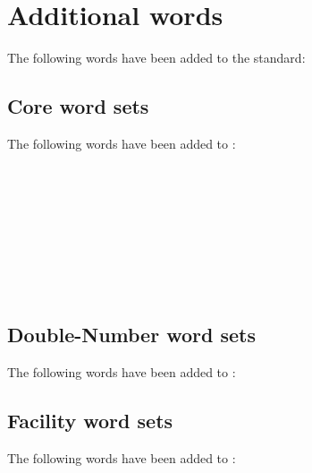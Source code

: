 
\section{Additional words} %
\label{diff:new12}

The following words have been added to the standard:

\setcounter{subsection}{5}
\subsection{Core word sets}
The following words have been added to :

\begin{minipage}[t]{0.3\linewidth}
	 \\
	 \\
\end{minipage}
\hfill
\begin{minipage}[t]{0.3\linewidth}
	 \\
	 \\
\end{minipage}
\hfill
\begin{minipage}[t]{0.3\linewidth}
	 \\
	 \\
\end{minipage}



\subsection{Double-Number word sets}
The following words have been added to :



\subsection{Facility word sets}
The following words have been added to :

